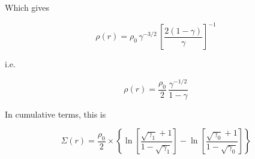 \documentclass[11pt]{article}
\begin{document}
Which gives

\begin{equation}
\rho(r) = \rho_0\,\gamma^{-3/2}\,\left[\frac{2(1-\gamma)}{\gamma}\right]^{-1}
\end{equation}

i.e.

\begin{equation}
\rho(r) = \frac{\rho_0}{2}\,\frac{\gamma^{-1/2}}{1-\gamma}
\end{equation}

In cumulative terms, this is

\begin{equation}
\Sigma(r) = \frac{\rho_0}{2} \times \left\{ \ln{\left[\frac{\sqrt{\gamma_1}+1}{1-\sqrt{\gamma_1}}\right]} - \ln{\left[\frac{\sqrt{\gamma_0}+1}{1-\sqrt{\gamma_0}}\right]} \right\}
\end{equation}
\end{document}
